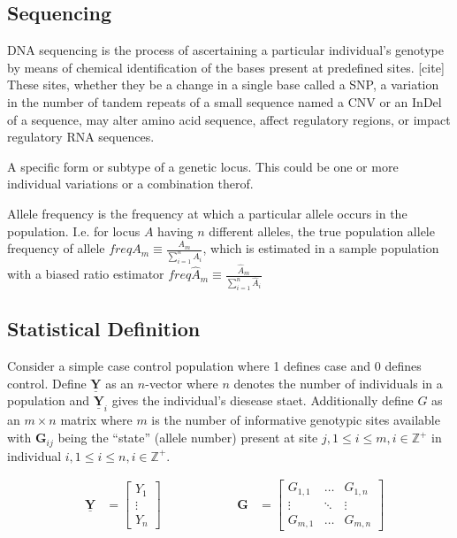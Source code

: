 \subsection{Sequencing}

DNA sequencing is the process of ascertaining a particular individual's genotype by means of chemical identification of the bases present at predefined sites. [cite] These sites, whether they be a change in a single base called a \ac{SNP}, a variation in the number of tandem repeats of a small sequence named a \ac{CNV} or an \ac{InDel} of a sequence, may alter amino acid sequence, affect regulatory regions, or impact regulatory \ac{RNA} sequences.

\begin{definition}[Allele]
A specific form or subtype of a genetic locus. This could be one or more individual variations or a combination therof. 
\end{definition}

\begin{rem}
Allele frequency is the frequency at which a particular allele occurs in the population. I.e. for locus $A$ having $n$ different alleles, the true population allele frequency of allele $freq A_m \equiv \frac{A_m}{ \sum^n_{i=1} A_i}$, which is estimated in a sample population with a biased ratio estimator $freq \hat{A}_m \equiv \frac{\hat{A}_m}{ \sum^n_{i=1} \hat{A}_i}$  
\end{rem}

\subsection{Statistical Definition}

Consider a simple case control population where 1 defines case and 0 defines control. Define $\underline{\mathbf{Y}}$ as an $n$-vector where $n$ denotes the number of individuals in a population and $\underline{\mathbf{Y}}_i$ gives the individual's diesease staet. Additionally define $G$ as an $m \times n$ matrix where $m$ is the number of informative genotypic sites available with $\mathbf{G}_{ij}$ being the ``state'' (allele number) present at site $j, 1 \leq i \leq m, i \in \mathbb{Z}^+$ in individual $i, 1 \leq i \leq n, i \in \mathbb{Z}^+$.

$$ \begin{aligned} &\mathbf{\underline{Y}} &= \begin{bmatrix} Y_1 \\ \vdots \\ Y_n \end{bmatrix} \, \, \, \, \, \, \, \,\, \, \, \,\, \, \, \, \, \, \, \, \, \, \, \,\, \, \, \,\, \, \, \, &  \mathbf{G} &= \begin{bmatrix} G_{1,1} & \dots & G_{1, n} \\ \vdots & \ddots & \vdots \\ G_{m, 1} & \dots & G_{m, n} \end{bmatrix} \end{aligned} $$


